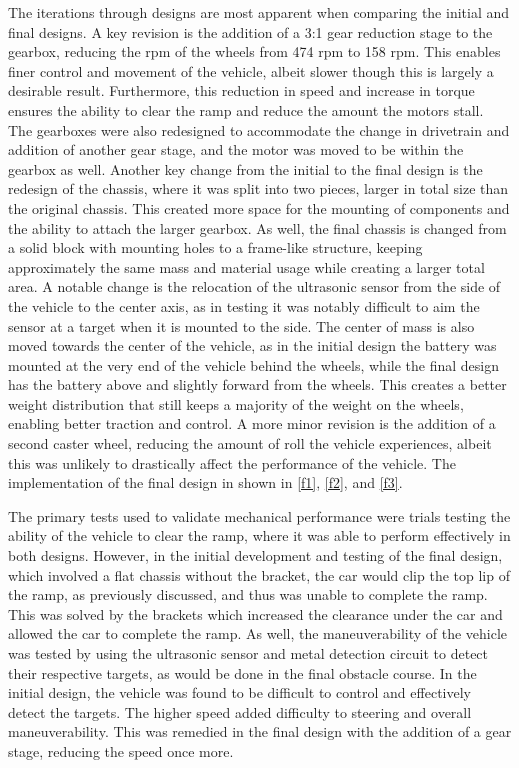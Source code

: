 \documentclass[11pt]{article}
\begin{document}
The iterations through designs are most apparent when comparing the initial and final designs. A key revision is the addition of a 3:1 gear reduction stage to the gearbox, reducing the rpm of the wheels from 474 rpm to 158 rpm. This enables finer control and movement of the vehicle, albeit slower though this is largely a desirable result. Furthermore, this reduction in speed and increase in torque ensures the ability to clear the ramp and reduce the amount the motors stall. The gearboxes were also redesigned to accommodate the change in drivetrain and addition of another gear stage, and the motor was moved to be within the gearbox as well. Another key change from the initial to the final design is the redesign of the chassis, where it was split into two pieces, larger in total size than the original chassis. This created more space for the mounting of components and the ability to attach the larger gearbox. As well, the final chassis is changed from a solid block with mounting holes to a frame-like structure, keeping approximately the same mass and material usage while creating a larger total area. A notable change is the relocation of the ultrasonic sensor from the side of the vehicle to the center axis, as in testing it was notably difficult to aim the sensor at a target when it is mounted to the side. The center of mass is also moved towards the center of the vehicle, as in the initial design the battery was mounted at the very end of the vehicle behind the wheels, while the final design has the battery above and slightly forward from the wheels. This creates a better weight distribution that still keeps a majority of the weight on the wheels, enabling better traction and control. A more minor revision is the addition of a second caster wheel, reducing the amount of roll the vehicle experiences, albeit this was unlikely to drastically affect the performance of the vehicle. The implementation of the final design in shown in \autoref{f1}, \autoref{f2}, and \autoref{f3}.

The primary tests used to validate mechanical performance were trials testing the ability of the vehicle to clear the ramp, where it was able to perform effectively in both designs. However, in the initial development and testing of the final design, which involved a flat chassis without the bracket, the car would clip the top lip of the ramp, as previously discussed, and thus was unable to complete the ramp. This was solved by the brackets which increased the clearance under the car and allowed the car to complete the ramp. As well, the maneuverability of the vehicle was tested by using the ultrasonic sensor and metal detection circuit to detect their respective targets, as would be done in the final obstacle course. In the initial design, the vehicle was found to be difficult to control and effectively detect the targets. The higher speed added difficulty to steering and overall maneuverability. This was remedied in the final design with the addition of a gear stage, reducing the speed once more.
\end{document}
